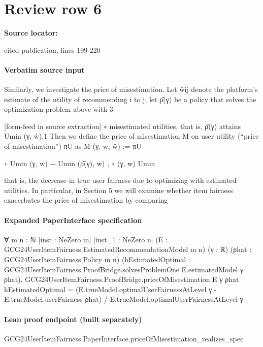 \documentclass[10pt]{article}
\begin{document}
\section*{Review row 6}
\textbf{Source locator:} {\footnotesize\raggedright cited publication, lines 199-\allowbreak{}220\par}
\paragraph{Verbatim source input}
\begin{ReviewVerbatim}
Similarly, we investigate the price of misestimation. Let ŵij denote the platform’s estimate of the
utility of recommending i to j; let ρ̂(γ) be a policy that solves the optimization problem above with
3


[form-feed in source extraction]
∗
misestimated utilities, that is, ρ̂(γ) attains Umin
(γ, ŵ).1 Then we define the price of misestimation
M
on user utility (“price of misestimation”) πU as
M
(γ, w, ŵ) :=
πU

∗
Umin
(γ, w) − Umin (ρ̂(γ), w)
,
∗ (γ, w)
Umin

that is, the decrease in true user fairness due to optimizing with estimated utilities. In particular, in
Section 5 we will examine whether item fairness exacerbates the price of misestimation by comparing
\end{ReviewVerbatim}


\paragraph{Expanded PaperInterface specification}
\begin{ReviewVerbatim}
∀ {m n : ℕ} [inst : NeZero m] [inst_1 : NeZero n] (E : GCG24UserItemFairness.EstimatedRecommendationModel m n) (γ : ℝ)
  (ρhat : GCG24UserItemFairness.Policy m n)
  (hEstimatedOptimal : GCG24UserItemFairness.ProofBridge.solvesProblemOne E.estimatedModel γ ρhat),
  GCG24UserItemFairness.ProofBridge.priceOfMisestimation E γ ρhat hEstimatedOptimal =
    (E.trueModel.optimalUserFairnessAtLevel γ - E.trueModel.userFairness ρhat) /
      E.trueModel.optimalUserFairnessAtLevel γ
\end{ReviewVerbatim}

\paragraph{Lean proof endpoint (built separately)}\begin{ReviewVerbatim}
GCG24UserItemFairness.PaperInterface.priceOfMisestimation_realizes_spec
\end{ReviewVerbatim}
\end{document}

